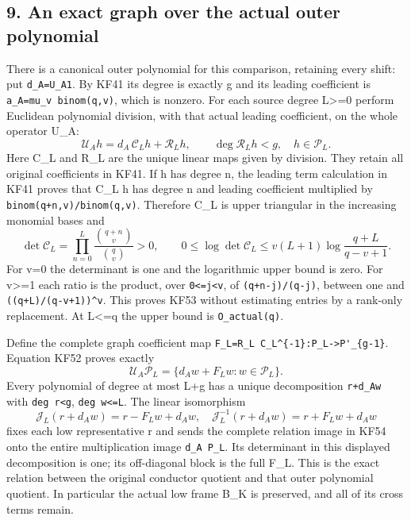 \subsection{9. An exact graph over the actual outer polynomial}\label{an-exact-graph-over-the-actual-outer-polynomial}

There is a canonical outer polynomial for this comparison, retaining every shift: put \texttt{d\_A=U\_A1}. By KF41 its degree is exactly g and its leading coefficient is \nolinkurl{a_A=mu_v binom(q,v)}, which is nonzero. For each source degree L\textgreater=0 perform Euclidean polynomial division, with that actual leading coefficient, on the whole operator U\_A: \[
\mathcal U_Ah=d_A\,\mathcal C_Lh+\mathcal R_Lh,
\qquad \deg\mathcal R_Lh<g,\quad h\in\mathcal P_L.
\tag{KF52}
\] Here C\_L and R\_L are the unique linear maps given by division. They retain all original coefficients in KF41. If h has degree n, the leading term calculation in KF41 proves that C\_L h has degree n and leading coefficient multiplied by \nolinkurl{binom(q+n,v)/binom(q,v)}. Therefore C\_L is upper triangular in the increasing monomial bases and \[
\det\mathcal C_L=
\prod_{n=0}^L\frac{\binom{q+n}{v}}{\binom qv}>0,
\qquad
0\le\log\det\mathcal C_L
\le v(L+1)\log\frac{q+L}{q-v+1}.
\tag{KF53}
\] For v=0 the determinant is one and the logarithmic upper bound is zero. For v\textgreater=1 each ratio is the product, over \texttt{0\textless{}=j\textless{}v}, of \texttt{(q+n-j)/(q-j)}, between one and \nolinkurl{((q+L)/(q-v+1))^v}. This proves KF53 without estimating entries by a rank-only replacement. At L\textless=q the upper bound is \texttt{O\_actual(q)}.

Define the complete graph coefficient map \nolinkurl{F_L=R_L C_L^{-1}:P_L->P'_{g-1}}. Equation KF52 proves exactly \[
\mathcal U_A\mathcal P_L
=\{d_Aw+F_Lw:w\in\mathcal P_L\}.
\tag{KF54}
\] Every polynomial of degree at most L+g has a unique decomposition \texttt{r+d\_Aw} with \texttt{deg\ r\textless{}g}, \texttt{deg\ w\textless{}=L}. The linear isomorphism \[
\mathcal J_L(r+d_Aw)=r-F_Lw+d_Aw,
\quad
\mathcal J_L^{-1}(r+d_Aw)=r+F_Lw+d_Aw
\tag{KF55}
\] fixes each low representative r and sends the complete relation image in KF54 onto the entire multiplication image \texttt{d\_A\ P\_L}. Its determinant in this displayed decomposition is one; its off-diagonal block is the full F\_L. This is the exact relation between the original conductor quotient and that outer polynomial quotient. In particular the actual low frame B\_K is preserved, and all of its cross terms remain.

